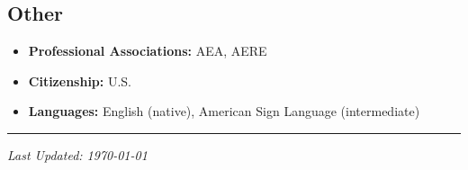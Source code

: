 \documentclass[12pt]{res} %
\begin{document}
\begin{resume}
\vspace{-.2in}

\subsection{Other}

\begin{itemize}
	\item[] \textbf{Professional Associations:} AEA, AERE
	\item[] \textbf{Citizenship:} U.S.
	\item[] \textbf{Languages:} English (native), American Sign Language (intermediate)
\end{itemize}
\hrule

\vspace{0.1in} %



\centerline{\emph{Last Updated: \today}}
\pagebreak



\end{resume}
\end{document}
